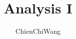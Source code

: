 \documentclass[12pt]{book}
\title{Analysis I}
\author{ChienChiWang}
\begin{document}
\begin{CJK*}{UTF8}{bsmi}

\maketitle

\tableofcontents{}

\theoremstyle{definition}
\newtheorem{axiom}{Axiom}[chapter]
\newtheorem{assumption}[axiom]{Assumption}
\newtheorem{additional corollary}{Additional Corollary}[section]
\newtheorem{exercise}{Exercise}[section]
\newtheorem{theorem}{Theorem}[section]
\newtheorem{corollary}[theorem]{Corollary}
\newtheorem{definition}[theorem]{Definition}
\newtheorem{example}[theorem]{Example}
\newtheorem{lemma}[theorem]{Lemma}
\newtheorem{proposition}[theorem]{Proposition}
\newtheorem{remark}[theorem]{Remark}
\newtheorem*{note}{Note}

\theoremstyle{remark}
\newtheorem*{meta-proof}{Meta-proof}

\renewcommand{\labelenumi}{\textnormal{(}\alph{enumi}\textnormal{)}}

\DeclarePairedDelimiter\abs{\lvert}{\rvert}
\DeclarePairedDelimiter\ceil{\lceil}{\rceil}
\DeclarePairedDelimiter\floor{\lfloor}{\rfloor}

\newcommand{\exercisesection}{
    \begin{center}
        --- Exercises ---
    \end{center}
}





\end{CJK*}
\end{document}
